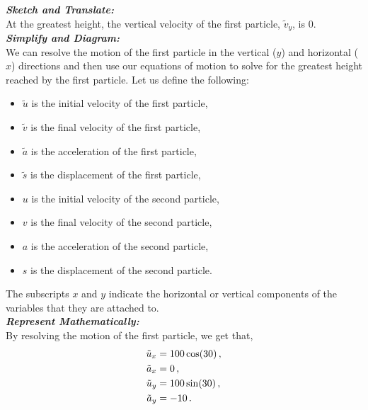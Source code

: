 \begin{subquestions}
	
\subquestion

\textbf{\textit{Sketch and Translate:}} \\
At the greatest height, the vertical velocity of the first particle, $\tilde{v}_y$, is 0.\\




\textbf{\textit{Simplify and Diagram:}} \\
We can resolve the motion of the first particle in the vertical ($y$) and horizontal ($x$) directions and then use our equations of motion to solve for the greatest height reached by the first particle. Let us define the following:
\begin{itemize}
	\item $\tilde{u}$ is the initial velocity of the first particle,
	\item $\tilde{v}$ is the final velocity of the first particle,
	\item $\tilde{a}$ is the acceleration of the first particle,
	\item $\tilde{s}$ is the displacement of the first particle,
	\item $u$ is the initial velocity of the second particle,
	\item $v$ is the final velocity of the second particle,
	\item $a$ is the acceleration of the second particle,
	\item $s$ is the displacement of the second particle.
\end{itemize}
The subscripts $x$ and $y$ indicate the horizontal or vertical components of the variables that they are attached to.\\



\textbf{\textit{Represent Mathematically:}} \\
By resolving the motion of the first particle, we get that,
\begin{align}
	\tilde{u}_x & = 100 \cos(30) \,, \nonumber \\
	\tilde{a}_x & = 0 \,, \nonumber \\
	\tilde{u}_y & = 100 \sin(30) \,, \nonumber \\
	\tilde{a}_y & = -10 \,. 
\end{align}


\end{subquestions}
